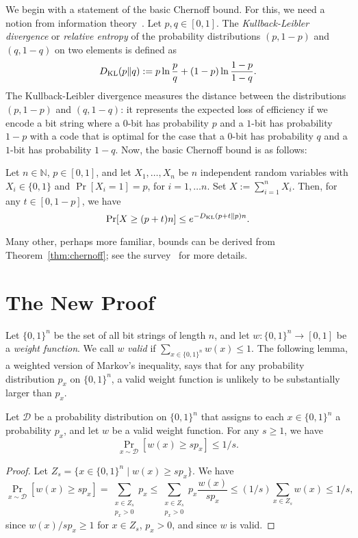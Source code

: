 \documentclass[a4paper,english,numberwithinsect]{oasics-v2016}
\newcommand{\DKL}{D_\textup{KL}}
\newcommand{\eqdef}{:=}
\newcommand{\N}{\mathbb{N}}
\begin{document}
We begin with a statement of the basic Chernoff bound.
For this, we need a notion from information theory~\cite{CoverTo06}.
Let $p, q \in [0,1]$.
The \emph{Kullback-Leibler divergence} or \emph{relative entropy} of 
the probability distributions $(p, 1-p)$ and $(q, 1-q)$ on 
two elements is defined as
\[
  \DKL(p \| q) \eqdef p \ln \frac{p}{q} + (1-p) \ln \frac{1-p}{1-q}.
\]
The Kullback-Leibler divergence measures the distance between the
distributions $(p, 1-p)$ and $(q, 1-q)$: it represents the 
expected loss of efficiency 
if we encode a bit string where a $0$-bit has probability $p$
and a $1$-bit has probability $1-p$ with a code 
that is optimal for the case that a $0$-bit has probability $q$ and
a $1$-bit has probability $1-q$.
Now, the basic Chernoff bound is as follows:
\begin{theorem}\label{thm:chernoff}
Let $n \in \N$, $p \in [0,1]$, and let $X_1, \dots, X_n$ be $n$ independent 
random variables with $X_i \in \{0,1\}$
and $\Pr[X_i = 1] = p$, for $i = 1, \dots n$. 
Set $X \eqdef \sum_{i=1}^n X_i$.
  Then, for any $t \in [0, 1-p]$, we have
  \[
    \Pr[X \geq (p+t)n ] \leq e^{-\DKL(p+t \| p)n}.
  \]
\end{theorem}
Many other, perhaps more familiar, bounds can be derived from 
Theorem~\ref{thm:chernoff}; see the survey~\cite{Mulzer17}
for more details.

\section{The New Proof}

Let $\{0,1\}^n$ be the set of all bit strings of length $n$,
and let $w: \{0, 1\}^n \rightarrow [0,1]$ be a
\emph{weight function}. We call $w$
\emph{valid} if $\sum_{x \in \{0,1\}^n} w(x) \leq 1$.
The following lemma, a weighted version of Markov's inequality, 
says that for any probability distribution
$p_x$ on $\{0,1\}^n$, a valid weight function 
is unlikely to be substantially larger than $p_x$.
\begin{lemma}\label{lem:encoding}
Let $\mathcal{D}$ be a probability 
distribution on $\{0,1\}^n$ that assigns to each $x \in \{0,1\}^n$
a probability $p_x$, and let $w$ be a valid 
weight function. 
For any $s \geq 1$, we have 
\[
  \Pr_{x \sim \mathcal{D}}\left[w(x) \geq sp_x\right] 
     \leq 1/s.
\]
\end{lemma}

\begin{proof}
Let $Z_{s} = \{ x \in \{0,1\}^n \mid w(x) \geq sp_x\}$.
We have
\[
  \Pr_{x \sim \mathcal{D}}\left[w(x) \geq s p_x\right] 
  = \sum_{\substack{x \in Z_s \\ p_x > 0}}  p_x
  \leq \sum_{\substack{x \in Z_s \\ p_x > 0}} p_x \frac{w(x)}{sp_x}
  \leq  (1/s) \sum_{x \in Z_s} w(x) 
    \leq 1/s,
\]
since $w(x) / sp_x  \geq 1$ for $x \in Z_s$, $p_x > 0$,  and since
$w$ is valid.
\end{proof}
\end{document}
